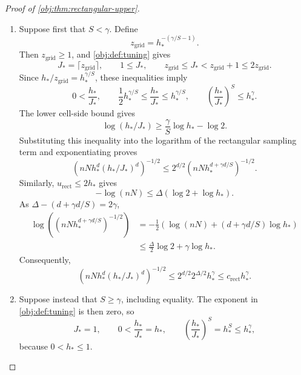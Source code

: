 \documentclass[11pt]{article}
\begin{document}
\begin{proof}[Proof of \cref{obj:thm:rectangular-upper}]
\begin{enumerate}
\item Suppose first that \(S<\gamma\). Define
\[
z_{\mathrm{grid}}=h_*^{-(\gamma/S-1)}.
\]
Then \(z_{\mathrm{grid}}\ge1\), and \cref{obj:def:tuning} gives
\[
J_*=\lceil z_{\mathrm{grid}}\rceil,\qquad
1\le J_*,\qquad
z_{\mathrm{grid}}\le J_*<z_{\mathrm{grid}}+1
\le2z_{\mathrm{grid}}.
\]
Since \(h_*/z_{\mathrm{grid}}=h_*^{\gamma/S}\), these inequalities imply
\[
0<\frac{h_*}{J_*},\qquad
\frac12h_*^{\gamma/S}
\le\frac{h_*}{J_*}\le h_*^{\gamma/S},
\qquad
\left(\frac{h_*}{J_*}\right)^S\le h_*^\gamma.
\]
The lower cell-side bound gives
\[
\log(h_*/J_*)\ge\frac{\gamma}{S}\log h_*-\log2.
\]
Substituting this inequality into the logarithm of the rectangular sampling term and exponentiating proves
\[
\left(nNh_*^d(h_*/J_*)^d\right)^{-1/2}
\le
2^{d/2}
\left(nNh_*^{d+\gamma d/S}\right)^{-1/2}.
\]
Similarly, \(u_{\mathrm{rect}}\le2h_*\) gives
\[
-\log(nN)\le\Delta(\log2+\log h_*).
\]
As \(\Delta-(d+\gamma d/S)=2\gamma\),
\[
\begin{aligned}
\log\left(\left(nNh_*^{d+\gamma d/S}\right)^{-1/2}\right)
&=-\frac12\left(\log(nN)
 +(d+\gamma d/S)\log h_*\right)\\
&\le\frac{\Delta}{2}\log2+\gamma\log h_*.
\end{aligned}
\]
Consequently,
\[
\left(nNh_*^d(h_*/J_*)^d\right)^{-1/2}
\le2^{d/2}2^{\Delta/2}h_*^\gamma
\le c_{\mathrm{rect}}h_*^\gamma.
\]%

\item Suppose instead that \(S\ge\gamma\), including equality. The exponent in
\cref{obj:def:tuning} is then zero, so
\[
J_*=1,\qquad
0<\frac{h_*}{J_*}=h_*,
\qquad
\left(\frac{h_*}{J_*}\right)^S
=h_*^S\le h_*^\gamma,
\]
because \(0<h_*\le1\).


\end{enumerate}
\end{proof}
\end{document}
